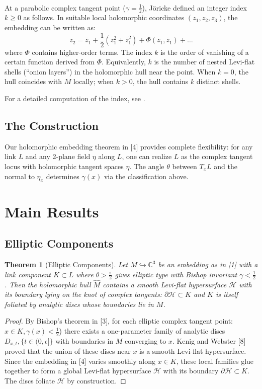 \documentclass{amsart}
\newtheorem{theorem}{Theorem}
\newcommand{\hatM}{\widehat{M}}
\begin{document}
\par\ \par

At a parabolic complex tangent point ($\gamma = \frac{1}{2}$), Jöricke defined an integer index $k \ge 0$ as follows. In suitable local holomorphic coordinates $(z_1, z_2, z_3)$, the embedding can be written as:
\[
z_2 = \bar{z}_1 + \frac{1}{2}(z_1^2 + \bar{z}_1^2) + \Phi(z_1, \bar{z}_1) + \dots
\]
where $\Phi$ contains higher-order terms. The index $k$ is the order of vanishing of a certain function derived from $\Phi$. Equivalently, $k$ is the number of nested Levi-flat shells (``onion layers'') in the holomorphic hull near the point. When $k = 0$, the hull coincides with $M$ locally; when $k > 0$, the hull contains $k$ distinct shells.

For a detailed computation of the index, see \cite{Joricke1990, Joricke1994}.

\subsection{The Construction}

Our holomorphic embedding theorem in [4] provides complete flexibility: for any link $L$ and any 2-plane field $\eta$ along $L$, one can realize $L$ as the complex tangent locus with holomorphic tangent spaces $\eta$. The angle $\theta$ between $T_xL$ and the normal to $\eta_x$ determines $\gamma(x)$ via the classification above.

\section{Main Results}
\subsection{Elliptic Components}
\begin{theorem}[Elliptic Components] Let $M \hookrightarrow \mathbb{C}^3$ be an embedding as in [1] with a link component $K \subset L$ where $\theta > \frac{\pi}{2}$ gives elliptic type with Bishop invariant $\gamma < \frac{1}{2}$. Then the holomorphic hull $\hatM$ contains a smooth Levi-flat hypersurface $\mathcal{H}$ with its boundary lying on the knot of complex tangents: $\partial\mathcal{H} \subset K$ and $K$ is itself foliated by analytic discs whose boundaries lie in $M$.
\end{theorem}
\begin{proof}
By Bishop's theorem in [3], for each elliptic complex tangent point: $x \in K, \gamma (x)< \frac{1}{2}$) there exists a one-parameter family of analytic discs ${D_{x,t},\{t \in (0,\epsilon]}\}$ with boundaries in $M$ converging to $x$. Kenig and Webster [8] proved that the union of these discs near $x$ is a smooth Levi-flat hypersurface. Since the embedding in [4] varies smoothly along $x \in K$, these local families glue together to form a global Levi-flat hypersurface $\mathcal{H}$ with its boundary $\partial \mathcal{H} \subset K$. The discs foliate $\mathcal{H}$ by construction.
\end{proof}
\end{document}

